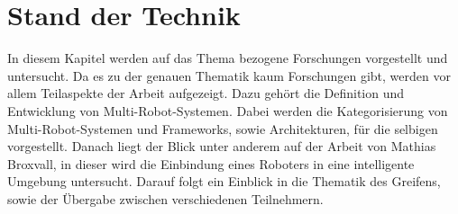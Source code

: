 \section{Stand der Technik}
\label{sec:relatedwork}

In diesem Kapitel werden auf das Thema bezogene Forschungen vorgestellt und untersucht. Da es zu der genauen Thematik kaum Forschungen gibt, werden vor allem Teilaspekte der Arbeit aufgezeigt. Dazu gehört die Definition und Entwicklung von Multi-Robot-Systemen. Dabei werden die Kategorisierung von Multi-Robot-Systemen und Frameworks, sowie Architekturen, für die selbigen vorgestellt. Danach liegt der Blick unter anderem auf der Arbeit von Mathias Broxvall, in dieser wird die Einbindung eines Roboters in eine intelligente Umgebung untersucht. Darauf folgt ein Einblick in die Thematik des Greifens, sowie der Übergabe zwischen verschiedenen Teilnehmern.




